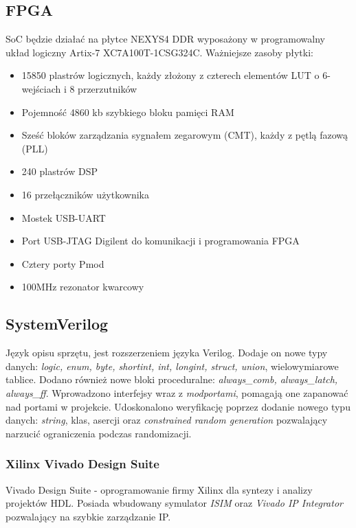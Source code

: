 \documentclass[11pt,a4paper]{article}
\begin{document}
	\subsection{FPGA}
	\hspace{5mm}
		SoC będzie działać na płytce NEXYS4 DDR wyposażony w programowalny układ logiczny Artix-7 XC7A100T-1CSG324C. Ważniejsze zasoby płytki:\cite{nexys}
		\begin{itemize}
			\item 15850 plastrów logicznych, każdy złożony z czterech elementów LUT o 6-wejściach i 8 przerzutników
			\item Pojemność 4860 kb szybkiego bloku pamięci RAM
			\item Sześć bloków zarządzania sygnałem zegarowym (CMT), każdy z pętlą fazową (PLL)
			\item 240 plastrów DSP
			\item 16 przełączników użytkownika
			\item Mostek USB-UART
			\item Port USB-JTAG Digilent do komunikacji i programowania FPGA
			\item Cztery porty Pmod
			\item 100MHz rezonator kwarcowy
		\end{itemize}

	\subsection{SystemVerilog}
	\hspace{5mm}
		Język opisu sprzętu, jest rozszerzeniem języka Verilog. Dodaje on nowe typy danych: \textit{logic, enum, byte, shortint, int, longint, struct, union}, wielowymiarowe tablice. Dodano również nowe bloki proceduralne: \textit{always\_comb, always\_latch, always\_ff}. Wprowadzono interfejsy wraz z \textit{modportami}, pomagają one zapanować nad portami w projekcie. Udoskonalono weryfikację poprzez dodanie nowego typu danych: \textit{string}, klas, asercji oraz \textit{constrained random generation} pozwalający narzucić ograniczenia podczas randomizacji.\cite{SV}
			
			\subsubsection{Xilinx Vivado Design Suite}
			\hspace{5mm}
				Vivado Design Suite - oprogramowanie firmy Xilinx dla syntezy i analizy projektów HDL. Posiada wbudowany symulator \textit{ISIM} oraz \textit{Vivado IP Integrator} pozwalający na szybkie zarządzanie IP.
				
\end{document}
